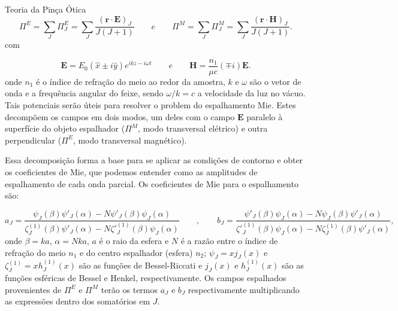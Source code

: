 \begin{chapter}{Teoria da Pinça Ótica}
\begin{equation}
\Pi^{E}=\sum\limits_{J} \Pi^{E}_J=\sum\limits_{J}\frac{ ({\mathbf r}\cdot{\mathbf E })_J }{J(J+1)} \qquad e\qquad \Pi^{M}=\sum\limits_{J} \Pi^{M}_J=\sum\limits_{J}\frac{ ({\mathbf r}\cdot{\mathbf H })_J }{J(J+1)} .
\label{debye_def}
\end{equation}
%
com

\begin{equation}
{\mathbf E}=E_0(\hat{x}\pm i \hat{y})e^{ikz-i\omega t} \qquad e\qquad {\mathbf H}=\frac{n_1}{\mu c}(\mp i){\mathbf E}.
\label{onda_plana}
\end{equation}
%
onde $n_1$ é o índice de refração do meio ao redor da amostra, $k$  e $\omega$ são o vetor de onda e a frequência angular do feixe, sendo $\omega/k=c$ a velocidade da luz no vácuo. Tais potenciais serão úteis para resolver o problem do espalhamento Mie. Estes decompõem os campos em dois modos, um deles com o campo ${\mathbf E}$ paralelo à superfície do objeto espalhador ($\Pi^{M}$, modo transversal elétrico) e outra perpendicular ($\Pi^{E}$, modo transversal magnético). 

Essa decomposição forma a base para se aplicar as condições de contorno e obter os coeficientes de Mie, que podemos entender como as amplitudes de espalhamento de cada onda parcial. Os coeficientes de Mie para o espalhamento são:

\begin{equation}
a_J=\frac{\psi_J(\beta)\psi'_J(\alpha)-N\psi'_J(\beta)\psi_J(\alpha)}{\zeta^{(1)}_J(\beta)\psi'_J(\alpha)-N\zeta'^{(1)}_J(\beta)\psi_J(\alpha)} \qquad ,\qquad
b_J=\frac{\psi'_J(\beta)\psi_J(\alpha)-N\psi_J(\beta)\psi'_J(\alpha)}{\zeta'^{(1)}_J(\beta)\psi_J(\alpha)-N\zeta^{(1)}_J(\beta)\psi'_J(\alpha)},
\label{mie}
\end{equation} 
%
onde $\beta=ka$, $\alpha=Nka$, $a$ é o raio da esfera e $N$ é a razão entre o índice de refração do meio $n_1$ e do centro espalhador (esfera) $n_2$; $\psi_J=xj_J(x)$ e $\zeta^{(1)}_J=xh^{(1)}_J(x)$ são as funções de Bessel-Riccati e $j_J(x)$ e $h^{(1)}_J(x)$ são as funções esféricas de Bessel e Henkel, respectivamente. Os campos espalhados provenientes de $\Pi^E$ e $\Pi^M$ terão os termos $a_J$ e $b_J$ respectivamente multiplicando as expressões dentro dos somatórios em $J$.


\end{chapter}
